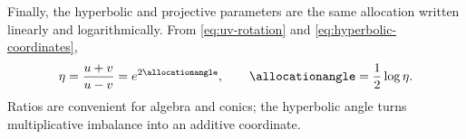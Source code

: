 

Finally, the hyperbolic and projective parameters are the same allocation
written linearly and logarithmically. From \cref{eq:uv-rotation} and
\cref{eq:hyperbolic-coordinates},
\begin{equation}
 \eta=\frac{u+v}{u-v}=e^{2\allocationangle},\qquad
 \allocationangle=\frac12\log\eta.
 \label{eq:eta-alpha}
\end{equation}
Ratios are convenient for algebra and conics; the hyperbolic angle turns
multiplicative imbalance into an additive coordinate.
